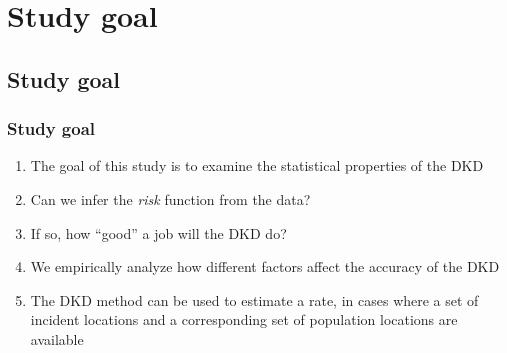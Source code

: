 \documentclass[notheorems]{beamer}
\theoremstyle{definition}
\theoremstyle{example}
\begin{document}
\section{Study goal}

\subsection{Study goal}
\begin{frame}\frametitle{Study goal}
    \begin{enumerate}
        \item The goal of this study is to examine the statistical properties of the DKD
        \item Can we infer the \emph{risk} function from the data?
        \item If so, how ``good'' a job will the DKD do?
        \item We empirically analyze how different factors affect the accuracy of the DKD
        \item The DKD method can be used to estimate a rate,
            in cases where a set of incident locations and a corresponding set of population locations are available 
    \end{enumerate}
\end{frame}

\end{document}
